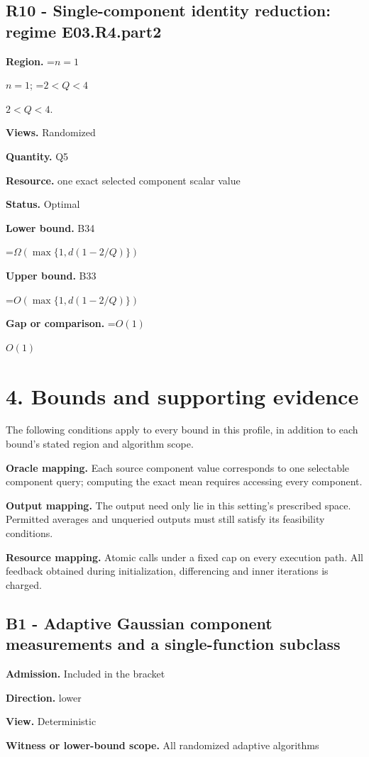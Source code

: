 \documentclass[10pt,a4paper]{article}
\newcommand{\AtlasMath}[1]{\par\begingroup\centering\setbox0=\hbox{$\displaystyle #1$}\ifdim\wd0>1.4\linewidth\typeout{ATLAS WIDE FORMULA: \the\wd0}\fi\ifdim\wd0>\linewidth\resizebox{\linewidth}{!}{\box0}\else\box0\fi\par\endgroup}
\newcommand{\AtlasInlineMath}[1]{\begingroup\setbox0=\hbox{$#1$}\ifdim\wd0>.4\linewidth\endgroup\AtlasMath{#1}\else\endgroup$#1$\fi}
\begin{document}
\subsection{R10 - Single-component identity reduction: regime E03.R4.part2}
\textbf{Region.} \AtlasInlineMath{n=1}; \AtlasInlineMath{2<Q<4}.

\textbf{Views.} Randomized

\textbf{Quantity.} Q5

\textbf{Resource.} one exact selected component scalar value

\textbf{Status.} Optimal

\textbf{Lower bound.} B34

\AtlasMath{\Omega(\max\{1,d(1-2/Q)\})}
\textbf{Upper bound.} B33

\AtlasMath{O(\max\{1,d(1-2/Q)\})}
\textbf{Gap or comparison.} \AtlasInlineMath{O(1)}

\section{4. Bounds and supporting evidence}
The following conditions apply to every bound in this profile, in addition to each bound's stated region and algorithm scope.

\textbf{Oracle mapping.} Each source component value corresponds to one selectable component query; computing the exact mean requires accessing every component.

\textbf{Output mapping.} The output need only lie in this setting's prescribed space. Permitted averages and unqueried outputs must still satisfy its feasibility conditions.

\textbf{Resource mapping.} Atomic calls under a fixed cap on every execution path. All feedback obtained during initialization, differencing and inner iterations is charged.

\subsection{B1 - Adaptive Gaussian component measurements and a single-function subclass}
\textbf{Admission.} Included in the bracket

\textbf{Direction.} lower

\textbf{View.} Deterministic

\textbf{Witness or lower-bound scope.} All randomized adaptive algorithms
\end{document}

